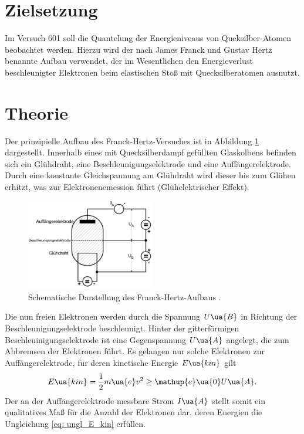 \setcounter{page}{1}
\section*{Zielsetzung}
Im Versuch 601 soll die Quantelung der Energieniveaus von Queksilber-Atomen beobachtet werden.
Hierzu wird der nach James Franck und Gustav Hertz benannte Aufbau verwendet, der im Wesentlichen
den Energieverlust beschleunigter Elektronen beim elastischen Stoß mit Quecksilberatomen ausnutzt.

\section{Theorie}
Der prinzipielle Aufbau des Franck-Hertz-Versuches ist in Abbildung \ref{fig: schema_aufbau} dargestellt. Innerhalb
eines mit Quecksilberdampf gefüllten Glaskolbens befinden sich ein Glühdraht, eine Beschleunigungselektrode und
eine Auffängerelektrode. Durch eine konstante Gleichspannung am Glühdraht wird dieser bis zum Glühen
erhitzt, was zur Elektronenemession führt (Glühelektrischer Effekt).
\begin{figure}
  \centering
  \includegraphics[width = 0.5\textwidth]{pics/schema_aufbau.png}
  \caption{Schematische Darstellung des Franck-Hertz-Aufbaus \cite{anleitung601}.}
  \label{fig: schema_aufbau}
\end{figure}
Die nun freien Elektronen werden durch die Spannung $U\ua{B}$ in Richtung der Beschleunigungselektrode
beschleunigt. Hinter der gitterförmigen Beschleuinigungselektrode ist eine Gegenspannung $U\ua{A}$ angelegt, die zum Abbremsen %
der Elektronen führt. Es gelangen nur solche Elektronen zur Auffängerelektrode, für deren kinetische Energie $E\ua{kin}$
gilt
\begin{equation}
 \label{eq: ungl_E_kin}
  E\ua{kin} = \frac{1}{2}m\ua{e}v^2 \geq \mathup{e}\ua{0}U\ua{A}.
\end{equation}
Der an der Auffängerelektrode messbare Strom $I\ua{A}$ stellt somit ein qualitatives Maß für die Anzahl der
Elektronen dar, deren Energien die Ungleichung \eqref{eq: ungl_E_kin} erfüllen.\\
